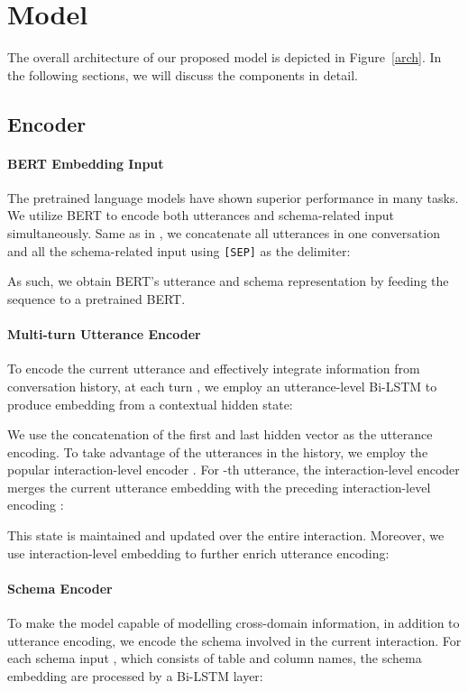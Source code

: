 \documentclass[letterpaper]{article} \usepackage{aaai21}  \usepackage{times}  \usepackage{helvet} \usepackage{courier}  \usepackage[hyphens]{url}  \usepackage{graphicx} \urlstyle{rm} \def\UrlFont{\rm}  \usepackage{natbib}  \usepackage{caption} \frenchspacing  \setlength{\pdfpagewidth}{8.5in}  \setlength{\pdfpageheight}{11in}
\begin{document}
\section{Model}
The overall architecture of our proposed model is depicted in Figure~\ref{arch}. In the following sections, we will discuss the components in detail. 


\subsection{Encoder}
\label{encoder}
\paragraph{BERT Embedding Input}
The pretrained language models have shown superior performance in many tasks. We utilize BERT \cite{DBLP:conf/naacl/DevlinCLT19} to encode both utterances and schema-related input simultaneously.
Same as in \cite{Hwang2019ACE}, we concatenate all utterances in one conversation and all the schema-related input using \texttt{[SEP]} as the delimiter:

As such, we obtain BERT's utterance and schema representation by feeding the sequence to a pretrained BERT.


\paragraph{Multi-turn Utterance Encoder} To encode the current utterance and effectively integrate information from conversation history, 
at each turn , we employ an utterance-level Bi-LSTM \cite{DBLP:journals/neco/HochreiterS97} to produce embedding from a contextual hidden state:



We use the concatenation of the first and last hidden vector as the utterance encoding.
To take advantage of the utterances in the history, we employ the popular interaction-level encoder \cite{DBLP:conf/naacl/SuhrIA18}. For -th utterance, 
the interaction-level encoder  merges the current utterance embedding  with the preceding interaction-level encoding :

This state is maintained and updated over the entire interaction.
Moreover, we use interaction-level embedding  to further enrich utterance encoding:



\paragraph{Schema Encoder}
To make the model capable of modelling cross-domain information, in addition to utterance encoding, we encode the schema involved in the current interaction.
For each schema input , which consists of table and column names, the schema embedding  are processed by a Bi-LSTM layer:
\end{document}
